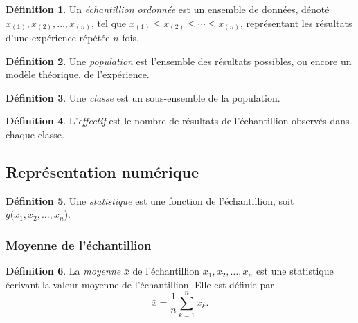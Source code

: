 \documentclass[11pt]{article}
\makeatletter
\theoremstyle{remark}
\theoremstyle{definition}
\newtheorem*{@definition}{Définition}
\newenvironment{definition}{%
	\begin{@definition}%
}{%
	\end{@definition}%
	\setcounter{property}{0}%
}
\makeatother
\begin{document}
\begin{definition}
	Un \textit{échantillion ordonnée} est un ensemble de données, dénoté
	$x_{(1)},x_{(2)},\dots,x_{(n)}$, tel que $x_{(1)}\leq x_{(2)}\leq\cdots\leq
	x_{(n)}$, représentant les résultats d'une expérience répétée $n$ fois.
\end{definition}

\begin{definition}
	Une \textit{population} est l'ensemble des résultats possibles, ou encore
	un modèle théorique, de l'expérience.
\end{definition}

\begin{definition}
	Une \textit{classe} est un sous-ensemble de la population.
\end{definition}

\begin{definition}
	L'\textit{effectif} est le nombre de résultats de l'échantillion observés
	dans chaque classe.
\end{definition}


\subsection{Représentation numérique}
\begin{definition}
	Une \textit{statistique} est une fonction de l'échantillion, soit $g(x_1,
	x_2,\dots,x_n$).
\end{definition}

\subsubsection{Moyenne de l'échantillion}
\begin{definition}
	La \textit{moyenne} $\bar{x}$ de l'échantillion $x_1,x_2,\dots,x_n$ est une
	statistique écrivant la valeur moyenne de l'échantillion. Elle est définie
	par
	\begin{equation*}
		\bar{x}=\frac{1}{n}\sum_{k=1}^nx_k.
	\end{equation*}
\end{definition}
\end{document}
